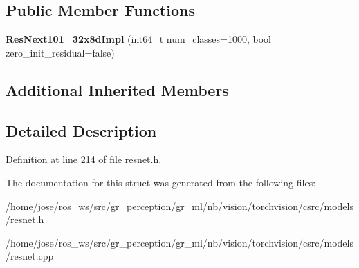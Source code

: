 \subsection*{Public Member Functions}
\begin{DoxyCompactItemize}
\item 
\mbox{\label{structvision_1_1models_1_1ResNext101__32x8dImpl_aeb8e129024e2cbbff584836812079e37}} 
{\bfseries Res\+Next101\+\_\+32x8d\+Impl} (int64\+\_\+t num\+\_\+classes=1000, bool zero\+\_\+init\+\_\+residual=false)
\end{DoxyCompactItemize}
\subsection*{Additional Inherited Members}


\subsection{Detailed Description}


Definition at line 214 of file resnet.\+h.



The documentation for this struct was generated from the following files\+:\begin{DoxyCompactItemize}
\item 
/home/jose/ros\+\_\+ws/src/gr\+\_\+perception/gr\+\_\+ml/nb/vision/torchvision/csrc/models/resnet.\+h\item 
/home/jose/ros\+\_\+ws/src/gr\+\_\+perception/gr\+\_\+ml/nb/vision/torchvision/csrc/models/resnet.\+cpp\end{DoxyCompactItemize}
